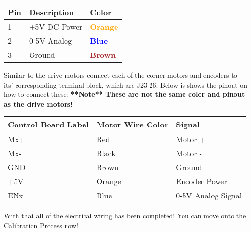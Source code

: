\documentclass[12pt]{article}
\begin{document}
\bigskip
\begin{tabular}[3] {| p{3cm} | p{7cm} | p{3cm} | }
	\hline
	\textbf{Pin} & \textbf{Description} & \textbf{Color} \\ \hline
	1 & +5V DC Power & \textcolor{orange}{\textbf{Orange}} \\ \hline
	2 & 0-5V Analog & \textcolor{blue}{\textbf{Blue}} \\ \hline
	3 & Ground & \textcolor{brown}{\textbf{Brown}} \\ \hline
\end{tabular}

\bigskip

Similar to the drive motors connect each of the corner motors and encoders to its' corresponding terminal block, which are J23-26. Below is shows the pinout on how to connect these: \textbf{**Note** These are not the same color and pinout as the drive motors!}

\bigskip

\begin{tabular}[3] {| l | l | l |}
	\hline
	\textbf{Control Board Label} & \textbf{Motor Wire Color} & \textbf{Signal} \\ \hline
	Mx+ & Red & Motor + \\ \hline
	Mx- & Black & Motor - \\ \hline
	GND & Brown & Ground \\ \hline
	+5V & Orange & Encoder Power \\ \hline
	ENx & Blue & 0-5V Analog Signal \\ \hline
	\hline
\end{tabular} 

\bigskip 
With that all of the electrical wiring has been completed! You can move onto the Calibration Process now!
\end{document}
